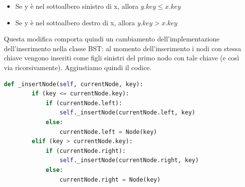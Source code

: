 \documentclass{article}
\begin{document}
\begin{center}
\begin{mybox}
	\begin{itemize}
    \item Se y è nel sottoalbero sinistro di x, allora \(y.key \le x.key\) 
     \item Se y è nel sottoalbero destro di x, allora \(y.key > x.key\) 
	\end{itemize}
\end{mybox}
\end{center}
\label{prop:bst-normal-implementation-prop}

Questa modifica comporta quindi un cambiamento dell'implementazione dell'inserimento nella classe BST: al momento dell'inserimento i nodi con stessa chiave vengono inseriti come figli sinistri del primo nodo con tale chiave (e così via ricorsivamente). Aggiustiamo quindi il codice.

\begin{lstlisting}[language=Python, caption={Funzione ausiliaria di inserimento aggiornata}]
    def _insertNode(self, currentNode, key):
        if (key <= currentNode.key):
            if (currentNode.left):
                self._insertNode(currentNode.left, key)
            else:
                currentNode.left = Node(key)
        elif (key > currentNode.key):
            if (currentNode.right):
                self._insertNode(currentNode.right, key)
            else:
                currentNode.right = Node(key)
\end{lstlisting}
\end{document}
